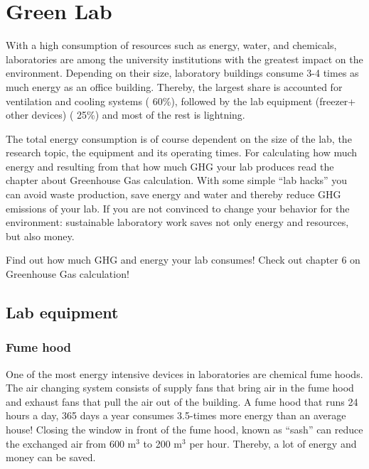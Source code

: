 
\chapter{Green Lab}\label{chap:lab}

With a high consumption of resources such as energy, water, and chemicals, laboratories are among the university institutions with the greatest impact on the environment. Depending on their size, laboratory buildings consume 3-4 times as much energy as an office building. Thereby, the largest share is accounted for ventilation and cooling systems (\raisebox{-0.9ex}{\~{ }} 60\%), followed by the lab equipment (freezer+ other devices) (\raisebox{-0.9ex}{\~{ }} 25\%) and most of the rest is lightning. \cite{GreenHarvard}

The total energy consumption is of course dependent on the size of the lab, the research topic, the equipment and its operating times. For calculating how much energy and resulting from that how much GHG your lab produces read the chapter about Greenhouse Gas calculation. %
With some simple “lab hacks” you can avoid waste production, save energy and water and thereby reduce GHG emissions of your lab. 
If you are not convinced to change your behavior for the environment: sustainable laboratory work saves not only energy and resources, but also money.

\begin{suggest}{Find out how much GHG and energy your lab consumes!}
	Check out chapter 6 on Greenhouse Gas calculation! %
\end{suggest}

\section{Lab equipment}

\subsection{Fume hood}
One of the most energy intensive devices in laboratories are chemical fume hoods. The air changing system consists of supply fans that bring air in the fume hood and exhaust fans that pull the air out of the building.  A fume hood that runs 24 hours a day, 365 days a year consumes 3.5-times more energy than an average house! Closing the window in front of the fume hood, known as “sash” can reduce the exchanged air from 600 m$^{3}$ to 200 m$^{3}$ per hour. Thereby, a lot of energy and money can be saved.

